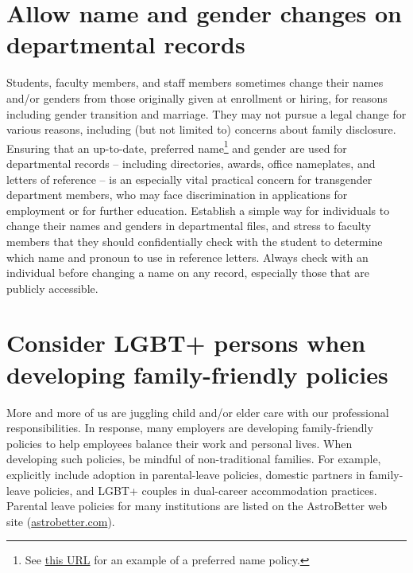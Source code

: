 \section {Allow name and gender changes on departmental records}
\label{name-changes}
Students, faculty members, and staff members sometimes change their names and/or genders from those originally given at enrollment or hiring, for reasons including gender transition and marriage. They may not pursue a legal change for various reasons, including (but not limited to) concerns about family disclosure. Ensuring that an up-to-date, preferred name\footnote{See \href{http://www.itcs.umich.edu/itcsdocs/r1461/}{this URL} for an example of a preferred name policy.} and gender are used for departmental records -- including directories, awards, office nameplates, and letters of reference -- is an especially vital practical concern for transgender department members, who may face discrimination in applications for employment or for further education. Establish a simple way for individuals to change their names and genders in departmental files, and stress to faculty members that they should confidentially check with the student to determine which name and pronoun to use in reference letters. Always check with an individual before changing a name on any record, especially those that are publicly accessible.


\section {Consider LGBT+ persons when developing family-friendly policies}
\label{families}
More and more of us are juggling child and/or elder care with our professional responsibilities.  In response, many employers are developing family-friendly policies to help employees balance their work and personal lives.  When developing such policies, be mindful of non-traditional families.  For example, explicitly include adoption in parental-leave policies, domestic partners in family-leave policies, and LGBT+ couples in dual-career accommodation practices.    Parental leave policies for many institutions are listed on the AstroBetter web site (\href{http://www.astrobetter.com/wiki/tiki-index.php?page=Leave+Policies}{astrobetter.com}).


